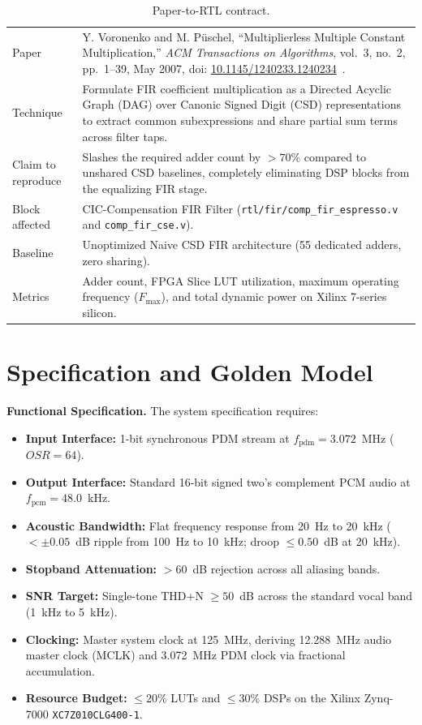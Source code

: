 \documentclass[11pt,a4paper]{article}
\begin{document}
\begin{table}[H]\centering\small
\caption{Paper-to-RTL contract.}\label{tab:contract}
\begin{tabularx}{\linewidth}{@{}lX@{}}
\toprule
Paper & Y. Voronenko and M. P\"uschel, ``Multiplierless Multiple Constant Multiplication,'' \emph{ACM Transactions on Algorithms}, vol.~3, no.~2, pp.~1--39, May 2007, doi: \href{https://doi.org/10.1145/1240233.1240234}{10.1145/1240233.1240234}~\cite{voronenko2007}.\\
Technique & Formulate FIR coefficient multiplication as a Directed Acyclic Graph (DAG) over Canonic Signed Digit (CSD) representations to extract common subexpressions and share partial sum terms across filter taps.\\
Claim to reproduce & Slashes the required adder count by $>70\%$ compared to unshared CSD baselines, completely eliminating DSP blocks from the equalizing FIR stage.\\
Block affected & CIC-Compensation FIR Filter (\texttt{rtl/fir/comp\_fir\_espresso.v} and \texttt{comp\_fir\_cse.v}).\\
Baseline & Unoptimized Naive CSD FIR architecture (55 dedicated adders, zero sharing).\\
Metrics & Adder count, FPGA Slice LUT utilization, maximum operating frequency ($F_{\text{max}}$), and total dynamic power on Xilinx 7-series silicon.\\
\bottomrule
\end{tabularx}
\end{table}

\section{Specification and Golden Model}
\label{sec:spec}

\textbf{Functional Specification.} The system specification requires:
\begin{itemize}
  \item \textbf{Input Interface:} 1-bit synchronous PDM stream at $f_{\text{pdm}} = 3.072$~MHz ($OSR = 64$).
  \item \textbf{Output Interface:} Standard 16-bit signed two's complement PCM audio at $f_{\text{pcm}} = 48.0$~kHz.
  \item \textbf{Acoustic Bandwidth:} Flat frequency response from 20~Hz to 20~kHz ($< \pm 0.05$~dB ripple from 100~Hz to 10~kHz; droop $\le 0.50$~dB at 20~kHz).
  \item \textbf{Stopband Attenuation:} $> 60$~dB rejection across all aliasing bands.
  \item \textbf{SNR Target:} Single-tone THD+N $\ge 50$~dB across the standard vocal band (1~kHz to 5~kHz).
  \item \textbf{Clocking:} Master system clock at 125~MHz, deriving 12.288~MHz audio master clock (MCLK) and 3.072~MHz PDM clock via fractional accumulation.
  \item \textbf{Resource Budget:} $\le 20\%$ LUTs and $\le 30\%$ DSPs on the Xilinx Zynq-7000 \texttt{XC7Z010CLG400-1}.
\end{itemize}
\end{document}
